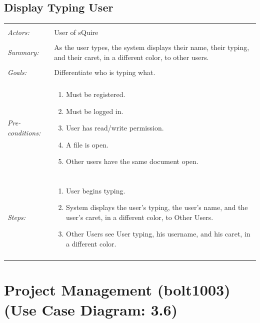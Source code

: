 \documentclass[11pt]{report}
\begin{document}
\subsection{Display Typing User}
\begin{tabular}{ p{2cm} p{12cm} }
\hline \\
	\textit{Actors:} & User of sQuire \\
	\\
	\textit{Summary:} & As the user types, the system displays their name, their typing, and their caret, in a different color, to other users. \\
	\\
	\textit{Goals:} & Differentiate who is typing what. \\
	\\
	\textit{Pre-conditions:} & \begin{enumerate}
		\item Must be registered.
		\item Must be logged in.
		\item User has read/write permission.
		\item A file is open.
		\item Other users have the same document open.
	\end{enumerate} \\
	\\
	\textit{Steps:} & \begin{enumerate}
		\item User begins typing.
		\item System displays the user's typing, the user's name, and the user's caret, in a different color, to Other Users.
		\item Other Users see User typing, his username, and his caret, in a different color.
	\end{enumerate} \\
	\\
\hline
\end{tabular}
\newpage

\section{Project Management (bolt1003) (Use Case Diagram: 3.6)}
\end{document}
